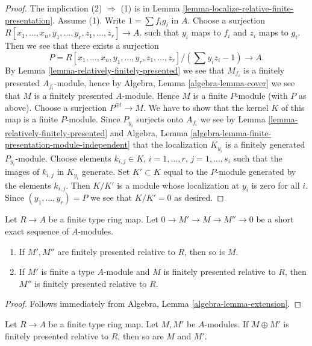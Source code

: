 \begin{proof}
The implication (2) $\Rightarrow$ (1) is in
Lemma \ref{lemma-localize-relative-finite-presentation}.
Assume (1). Write $1 = \sum f_ig_i$ in $A$.
Choose a surjection
$R[x_1, \ldots, x_n, y_1, \ldots, y_r, z_1, \ldots, z_r] \to A$.
such that $y_i$ maps to $f_i$ and $z_i$ maps to $g_i$. Then we
see that there exists a surjection
$$
P = R[x_1, \ldots, x_n, y_1, \ldots, y_r, z_1, \ldots, z_r]/(\sum y_iz_i - 1)
\longrightarrow
A.
$$
By
Lemma \ref{lemma-relatively-finitely-presented}
we see that $M_{f_i}$ is a finitely presented $A_{f_i}$-module, hence by
Algebra, Lemma \ref{algebra-lemma-cover}
we see that $M$ is a finitely presented $A$-module.
Hence $M$ is a finite $P$-module (with $P$ as above).
Choose a surjection $P^{\oplus t} \to M$.
We have to show that the kernel $K$ of this map is a finite
$P$-module. Since $P_{y_i}$ surjects onto
$A_{f_i}$ we see by
Lemma \ref{lemma-relatively-finitely-presented}
and
Algebra, Lemma \ref{algebra-lemma-finite-presentation-module-independent}
that the localization $K_{y_i}$ is a finitely generated
$P_{y_i}$-module. Choose elements
$k_{i, j} \in K$, $i = 1, \ldots, r$, $j = 1, \ldots, s_i$ such
that the images of $k_{i, j}$ in $K_{y_i}$ generate.
Set $K' \subset K$ equal to the $P$-module
generated by the elements $k_{i, j}$. Then $K/K'$ is a module
whose localization at $y_i$ is zero for all $i$. Since $(y_1, \ldots, y_r) = P$
we see that $K/K' = 0$ as desired.
\end{proof}

\begin{lemma}
\label{lemma-ses-relatively-finite-presentation}
Let $R \to A$ be a finite type ring map. Let $0 \to M' \to M \to M'' \to 0$
be a short exact sequence of $A$-modules.
\begin{enumerate}
\item If $M', M''$ are finitely presented relative to $R$, then so is $M$.
\item If $M'$ is finite a type $A$-module and $M$ is finitely presented
relative to $R$, then $M''$ is finitely presented relative to $R$.
\end{enumerate}
\end{lemma}

\begin{proof}
Follows immediately from
Algebra, Lemma \ref{algebra-lemma-extension}.
\end{proof}

\begin{lemma}
\label{lemma-sum-relatively-finite-presentation}
Let $R \to A$ be a finite type ring map.
Let $M, M'$ be $A$-modules. If $M \oplus M'$ is
finitely presented relative to $R$, then so are $M$ and $M'$.
\end{lemma}

